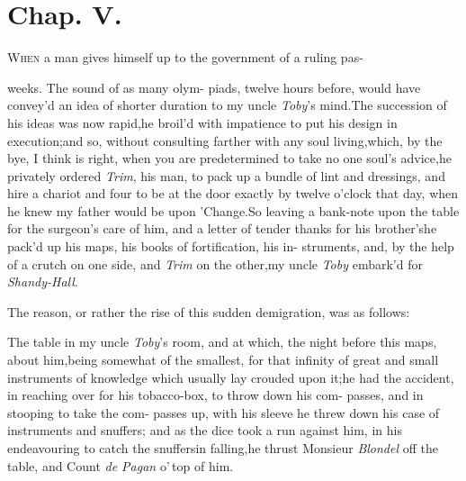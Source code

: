 \documentclass{article}
\begin{document}
\bigskip

\section{Chap. V.}

\lettrine{W}{hen} a man gives himself up to\break 
the government of a ruling pas-\break
{}

\noindent
{}
\pb
weeks. The sound of as many olym-\break
piads, twelve hours before, would have
convey’d an idea of shorter duration to my uncle
\textit{Toby}’s mind.\tsh The succession of his ideas
was now rapid,\tsk he broil’d with impatience to put his design
in execution;\tsk and so, without consulting farther with
any soul living,\tsk which, by the bye, I think is right, when
you are predetermined to take no one soul’s
advice,\tsk he privately ordered \textit{Trim}, his man, to
pack up a bundle of lint and dressings, and hire a chariot and four
to be at the door exactly by twelve o’clock that day, when he
knew my father would be upon ’Change.\tsk So leaving
a bank-note upon the table for the surgeon’s care of him, and
a letter of tender thanks\break 
for his brother’s\tsk he pack’d up his\break
maps, his books of fortification, his in-\break
struments, \etc\tsk and, by the help of a\pb 
crutch on one side, and \textit{Trim} on the\break
other,\tsh my uncle \textit{Toby} embark’d for\break
\textit{Shandy-Hall}.

The reason, or rather the rise of this sudden demigration, was as
follows:

The table in my uncle \textit{Toby}’s room, and at which,
the night before this\break 
{}
maps, \etc about him,\tsk being somewhat\break
of the smallest, for that infinity of great\break
and small instruments of knowledge\break
which usually lay crouded upon it;\tsk he\break
had the accident, in reaching over for\break
his tobacco-box, to throw down his com-\break
passes, and in stooping to take the com-\break
passes up, with his sleeve he threw down\break
his case of instruments and snuffers;\tsk\break
and as the dice took a run against him,\break
in his endeavouring to catch the snuffers\pb in
falling,\tsh he thrust Monsieur \textit{Blondel} off the
table, and Count \textit{de Pagan} o’\,top of him.
\end{document}
